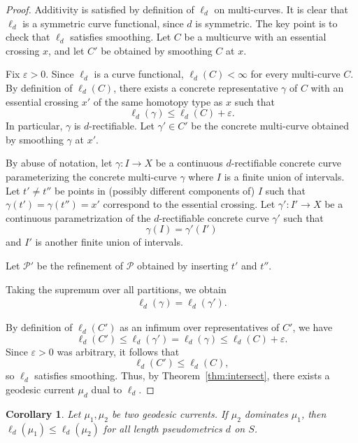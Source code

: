 \documentclass[11pt]{amsart}
\numberwithin{equation}{section}
\numberwithin{figure}{section}
\newtheorem{corollary}[theorem]{Corollary}
\theoremstyle{definition}
\theoremstyle{plain}
\renewcommand{\epsilon}{\varepsilon}
\begin{document}
\begin{proof}
Additivity is satisfied by definition of $\ell_d$ on multi-curves. It is clear that $\ell_d$ is a symmetric curve functional, since $d$ is symmetric.
The key point is to check that $\ell_d$ satisfies smoothing. 
Let $C$ be a multicurve with an essential crossing $x$, and let $C'$ be obtained by smoothing $C$ at $x$.

Fix $\epsilon>0$. Since $\ell_d$ is a curve functional, $\ell_d(C)<\infty$ for every multi-curve $C$. By definition of $\ell_d(C)$, there exists a concrete representative $\gamma$ of $C$ with an essential crossing $x'$ of the same homotopy type as $x$ such that
\[
\ell_d(\gamma) \le \ell_d(C) + \epsilon.
\]
In particular, $\gamma$ is $d$-rectifiable.
Let $\gamma' \in C'$ be the concrete multi-curve obtained by smoothing $\gamma$ at $x'$.

By abuse of notation, let $\gamma \colon I \to X$ be a continuous $d$-rectifiable concrete curve parameterizing the concrete multi-curve $\gamma$ where $I$ is a finite union of intervals. Let $t' \neq t''$ be points in (possibly different components of) $I$ such that $\gamma(t') = \gamma(t'') = x'$ correspond to the essential crossing. Let $\gamma' \colon I' \to X$ be a continuous parametrization of the $d$-rectifiable concrete curve $\gamma'$ such that
\[
\gamma(I) = \gamma'(I')
\]
and $I'$ is another finite union of intervals.

Let $\mathcal{P}'$ be the refinement of $\mathcal{P}$ obtained by inserting $t'$ and $t''$. 

Taking the supremum over all partitions, we obtain
\begin{align*}
\ell_d(\gamma)= \ell_d(\gamma').
\end{align*}

By definition of $\ell_d(C')$ as an infimum over representatives of $C'$, we have
\[
\ell_d(C') \le \ell_d(\gamma') = \ell_d(\gamma) \le \ell_d(C) + \epsilon.
\]
Since $\epsilon>0$ was arbitrary, it follows that
\[
\ell_d(C') \le \ell_d(C),
\]
so $\ell_d$ satisfies smoothing.
Thus, by Theorem~\ref{thm:intersect}, there exists a geodesic current $\mu_d$ dual to $\ell_d$.
\end{proof}

\begin{corollary}
Let $\mu_1, \mu_2$ be two geodesic currents. If $\mu_2$ dominates $\mu_1$, then
    $\ell_d(\mu_1) \leq \ell_d(\mu_2)$ for all length pseudometrics $d$ on $S$.
    \label{cor:domination}
\end{corollary}
\end{document}
